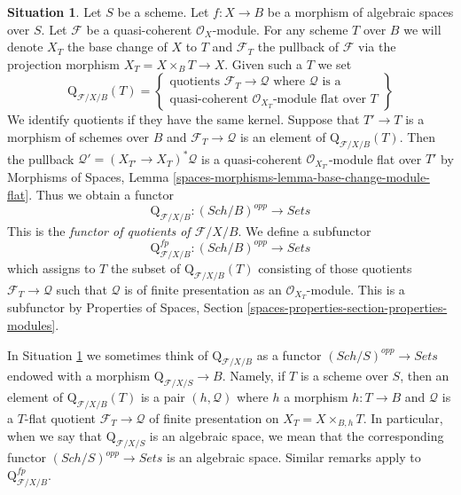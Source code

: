\documentclass{stacks-project}
\theoremstyle{plain}
\theoremstyle{definition}
\newtheorem{situation}[subsection]{Situation}
\theoremstyle{remark}
\numberwithin{equation}{subsection}
\def\Sch{\mathit{Sch}}
\begin{document}
\begin{situation}
\label{situation-q}
Let $S$ be a scheme. Let $f : X \to B$ be a morphism of algebraic spaces
over $S$. Let $\mathcal{F}$ be a quasi-coherent $\mathcal{O}_X$-module.
For any scheme $T$ over $B$ we will denote $X_T$ the base change of
$X$ to $T$ and $\mathcal{F}_T$ the pullback
of $\mathcal{F}$ via the projection morphism $X_T = X \times_B T \to X$.
Given such a $T$ we set
$$
\text{Q}_{\mathcal{F}/X/B}(T) =
\left\{
\begin{matrix}
\text{quotients }\mathcal{F}_T \to \mathcal{Q}\text{ where }
\mathcal{Q}\text{ is a}\\
\text{quasi-coherent }
\mathcal{O}_{X_T}\text{-module flat over }T
\end{matrix}
\right\}
$$
We identify quotients if they have the same kernel. Suppose
that $T' \to T$ is a morphism of schemes over $B$ and
$\mathcal{F}_T \to \mathcal{Q}$ is an element of
$\text{Q}_{\mathcal{F}/X/B}(T)$. Then the pullback
$\mathcal{Q}' = (X_{T'} \to X_T)^*\mathcal{Q}$ is a quasi-coherent
$\mathcal{O}_{X_{T'}}$-module flat over $T'$ by
Morphisms of Spaces, Lemma
\ref{spaces-morphisms-lemma-base-change-module-flat}.
Thus we obtain a functor
\begin{equation}
\label{equation-q}
\text{Q}_{\mathcal{F}/X/B} : (\Sch/B)^{opp} \longrightarrow \textit{Sets}
\end{equation}
This is the {\it functor of quotients of $\mathcal{F}/X/B$}.
We define a subfunctor
\begin{equation}
\label{equation-q-fp}
\text{Q}^{fp}_{\mathcal{F}/X/B} : (\Sch/B)^{opp} \longrightarrow \textit{Sets}
\end{equation}
which assigns to $T$ the subset of $\text{Q}_{\mathcal{F}/X/B}(T)$
consisting of those quotients $\mathcal{F}_T \to \mathcal{Q}$
such that $\mathcal{Q}$ is of finite presentation as an
$\mathcal{O}_{X_T}$-module. This is a subfunctor by
Properties of Spaces, Section
\ref{spaces-properties-section-properties-modules}.
\end{situation}

\noindent
In Situation \ref{situation-q} we sometimes think of
$\text{Q}_{\mathcal{F}/X/B}$ as a functor
$(\Sch/S)^{opp} \to \textit{Sets}$ endowed
with a morphism $\text{Q}_{\mathcal{F}/X/S} \to B$.
Namely, if $T$ is a scheme over $S$, then an element
of $\text{Q}_{\mathcal{F}/X/B}(T)$ is a pair $(h, \mathcal{Q})$
where $h$ a morphism $h : T \to B$
and $\mathcal{Q}$ is a $T$-flat quotient $\mathcal{F}_T \to \mathcal{Q}$
of finite presentation on $X_T = X \times_{B, h} T$. In particular, when we say
that $\text{Q}_{\mathcal{F}/X/S}$ is an algebraic space, we mean that the
corresponding functor $(\Sch/S)^{opp} \to \textit{Sets}$ is an algebraic space.
Similar remarks apply to $\text{Q}^{fp}_{\mathcal{F}/X/B}$.
\end{document}
